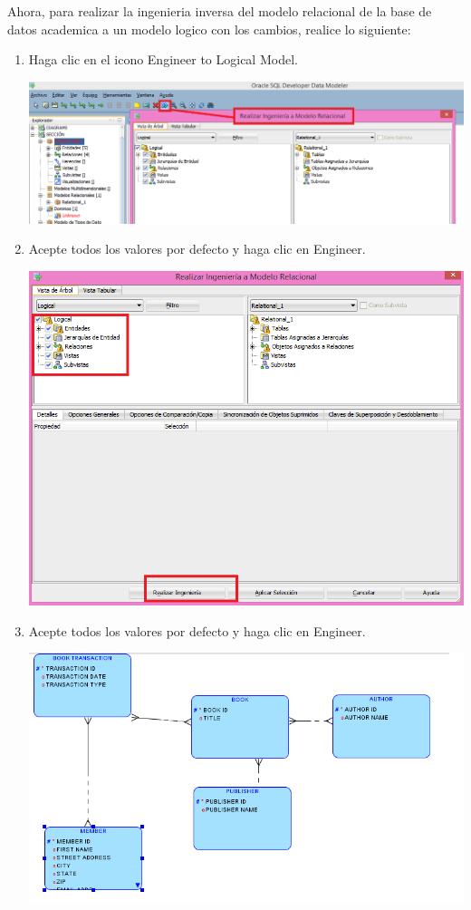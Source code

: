 \documentclass[12pt,letterpaper]{article}
\begin{document}
Ahora, para realizar la ingenieria inversa del modelo relacional de la base de datos academica a un modelo logico con los cambios, realice lo siguiente: \\
\begin{enumerate}[1.]
    \item  Haga clic en el icono Engineer to Logical Model. 
    
       \includegraphics[width=15cm]{./soniaImagen/diagrama3.png} 
     
    \item Acepte todos los valores por defecto y haga clic en Engineer.
    
       \includegraphics[width=15cm]{./soniaImagen/diagrama4.png}  
    
    \item Acepte todos los valores por defecto y haga clic en Engineer.
    
      \includegraphics[width=15cm]{./soniaImagen/diagrama7.png} 
    
		\end{enumerate}
\end{document}
